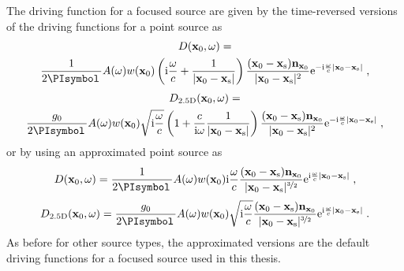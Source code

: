 The driving function for a focused source are given by the time-reversed
versions of the driving functions for a point source as
%
\begin{multline}
    D(\x_0,\omega) = \\
    \frac{1}{2\PI} A(\omega) w(\x_0) \left(\I\omegac +
    \frac{1}{|\x_0-\xs|} \right) \frac{(\x_0-\xs)\n_{\x_0}}{|\x_0-\xs|^2}
    \E^{-\I\omegac |\x_0-\xs|} \qc
    \label{eq:D_wfs_fs_without_approximation}
\end{multline}
%
\begin{multline}
    D_\twohalfD(\x_0,\omega) = \\
    \frac{g_0}{2\PI} A(\omega) w(\x_0) \sqrt{\I\omegac} \left(
    1 + \frac{c}{\I\omega} \frac{1}{|\x_0-\xs|}
    \right) \frac{(\x_0-\xs) \n_{\x_0}}{|\x_0-\xs|^2} \E^{-\I\omegac |\x_0-\xs|}
    \qc
    \label{eq:D_wfs_fs_25D_without_approximation}
\end{multline}
%
or by using an approximated point source as
%
\begin{equation}
    D(\x_0,\omega) = \frac{1}{2\PI} A(\omega) w(\x_0) \I\omegac
    \frac{(\x_0-\xs)\n_{\x_0}}{|\x_0-\xs|^{\nicefrac{3}{2}}}
    \E^{\I\omegac |\x_0-\xs|} \qc
    \label{eq:D_wfs_fs}
\end{equation}
%
\begin{equation}
    D_\twohalfD(\x_0,\omega) = \frac{g_0}{2\PI} A(\omega) w(\x_0) \sqrt{\I\omegac}
    \frac{(\x_0-\xs)\n_{\x_0}}{|\x_0-\xs|^{\nicefrac{3}{2}}}
    \E^{\I\omegac |\x_0-\xs|} \qp
    \label{eq:D_wfs_fs_25D}
\end{equation}
%
As before for other source types, the approximated versions are the default driving functions for a focused
source used in this thesis.

